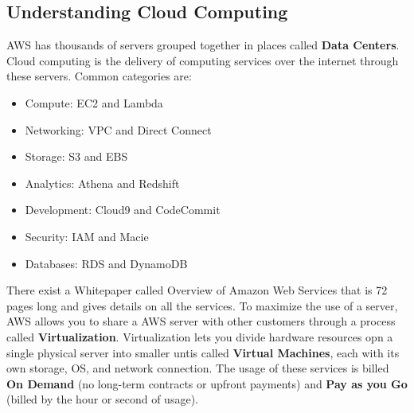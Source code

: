\documentclass{article}%
\begin{document}
\subsection{Understanding Cloud Computing}
AWS has thousands of servers grouped together in places called \textbf{Data Centers}. Cloud computing is the delivery of computing services over the internet through these servers. Common categories are:
\begin{itemize}
    \item Compute: EC2 and Lambda
    \item Networking: VPC and Direct Connect
    \item Storage: S3 and EBS
    \item Analytics: Athena and Redshift
    \item Development: Cloud9 and CodeCommit
    \item Security: IAM and Macie
    \item Databases: RDS and DynamoDB
\end{itemize}
There exist a Whitepaper called Overview of Amazon Web Services that is 72 pages long and gives details on all the services.
To maximize the use of a server, AWS allows you to share a AWS server with other customers through a process called \textbf{Virtualization}. Virtualization lets you divide hardware resources opn a single physical server into smaller untis called \textbf{Virtual Machines}, each with its own storage, OS, and network connection. The usage of these services is billed \textbf {On Demand} (no long-term contracts or upfront payments) and \textbf{Pay as you Go} (billed by the hour or second of usage).
\end{document}
